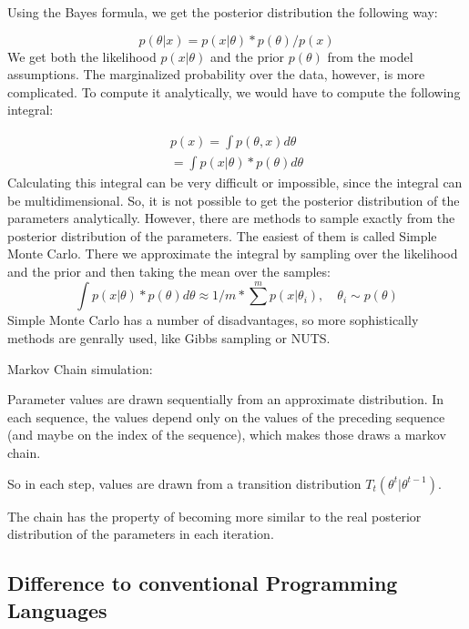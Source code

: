 \documentclass{article}
\begin{document}
Using the Bayes formula, we get the posterior distribution the following way:

\begin{equation}
	p(\theta|x) = p(x|\theta) * p(\theta) / p(x)
\end{equation}
We get both the likelihood $p(x|\theta)$ and the prior $p(\theta)$ from the model assumptions. The marginalized probability over the data, however, is more complicated. To compute it analytically, we would have to compute the following integral:

\begin{equation}
\begin{split}
	p(x) = \int p(\theta,x) d \theta \\
		 =  \int p(x|\theta) * p(\theta) d \theta
\end{split}
\end{equation}
Calculating this integral can be very difficult or impossible, since the integral can be multidimensional. So, it is not possible to get the posterior distribution of the parameters analytically. However, there are methods to sample exactly from the posterior distribution of the parameters. The easiest of them is called Simple Monte Carlo. There
we approximate the integral by sampling over the likelihood and the prior and then taking the mean over the samples:
\begin{equation}
	\int p(x|\theta) * p(\theta) d \theta \approx 1/m * \sum^m p(x|\theta_i),\quad \theta_i \sim p(\theta)
\end{equation}
Simple Monte Carlo has a number of disadvantages, so more sophistically methods are genrally used, like Gibbs sampling or NUTS.

Markov Chain simulation: 

Parameter values are drawn sequentially from an approximate distribution. In each sequence, the values depend only on the values of the preceding sequence (and maybe on the index of the sequence), which makes those draws a markov chain.

So in each step, values are drawn from a transition distribution $T_t(\theta^t|\theta^{t-1})$.

The chain has the property of becoming more similar to the real posterior distribution of the parameters in each iteration.

\subsection{Difference to conventional Programming Languages}
\end{document}
